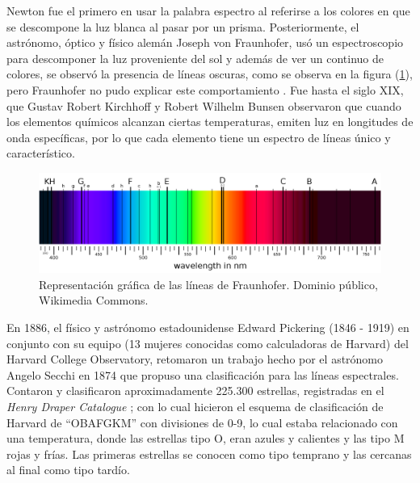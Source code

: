 \documentclass[12pt,oneside,openany,letter]{book}
\begin{document}
\noindent Newton fue el primero en usar la palabra espectro al referirse a los colores en que se descompone la luz blanca al pasar por un prisma. Posteriormente, el astrónomo, óptico y físico alemán Joseph von Fraunhofer, usó un espectroscopio para descomponer la luz proveniente del sol y además de ver un continuo de colores, se observó la presencia de líneas oscuras, como se observa en la figura (\ref{espectro_frauhofer}), pero Fraunhofer no pudo explicar este comportamiento \citep{von1823denkschriften}. Fue hasta el siglo XIX, que Gustav Robert Kirchhoff y Robert Wilhelm Bunsen observaron que cuando los elementos químicos alcanzan ciertas temperaturas, emiten luz en longitudes de onda específicas, por lo que cada elemento tiene un espectro de líneas único y característico.

\begin{figure}[h]
    \centering
    \includegraphics[width=1\linewidth]{Images/espectro_fraunhofer.png}
    \caption{Representación gráfica de las líneas de Fraunhofer. Dominio público, Wikimedia Commons.}
    \label{espectro_frauhofer}
\end{figure}

\noindent En 1886, el físico y astrónomo estadounidense Edward Pickering (1846 - 1919) en conjunto con su equipo (13 mujeres conocidas como calculadoras de Harvard) del Harvard College Observatory, retomaron un trabajo hecho por el astrónomo Angelo Secchi en 1874 que propuso una clasificación para las líneas espectrales. Contaron y clasificaron aproximadamente 225.300 estrellas, registradas en el \textit{Henry Draper Catalogue} \citep{gray2009stellar}; con lo cual hicieron el esquema de clasificación de Harvard de ``OBAFGKM'' con divisiones de 0-9, lo cual estaba relacionado con una temperatura, donde las estrellas tipo O, eran azules y calientes y las tipo M rojas y frías. Las primeras estrellas se conocen como tipo temprano y las cercanas al final como tipo tardío.
\vspace{2mm}
\end{document}
